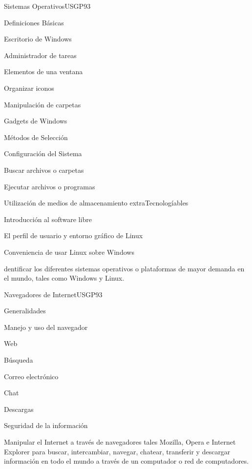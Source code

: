 \begin{syllabus}
\begin{unit}{Sistemas Operativos}{USGP}{9}{3}
\begin{topics}
      \item Definiciones Básicas
      \item Escritorio de Windows
      \item Administrador de tareas
      \item Elementos de una ventana
      \item Organizar iconos
      \item Manipulación de carpetas
      \item Gadgets de Windows 
      \item Métodos de Selección
      \item Configuración del Sistema
      \item Buscar archivos o carpetas
      \item Ejecutar archivos o programas
      \item Utilización de medios de almacenamiento extraTecnologíables
      \item Introducción al software libre
      \item El perfil de usuario y entorno gráfico de Linux
      \item Conveniencia de usar Linux sobre Windows
\end{topics}
\begin{unitgoals}
   \item dentificar los diferentes sistemas operativos o plataformas de mayor demanda en el mundo, tales como Windows y Linux.
\end{unitgoals}
\end{unit}

\begin{unit}{Navegadores de Internet}{USGP}{9}{3}
\begin{topics}
      \item Generalidades
      \item Manejo y uso del navegador
      \item Web
      \item Búsqueda
      \item Correo electrónico
      \item Chat
      \item Descargas
      \item Seguridad de la información
\end{topics}
\begin{unitgoals}
   \item Manipular el Internet a través de navegadores tales Mozilla, Opera e Internet Explorer para buscar, intercambiar, navegar, chatear, transferir y descargar información en todo el mundo a través de un computador o red de computadores.
\end{unitgoals}
\end{unit}


\end{syllabus}

